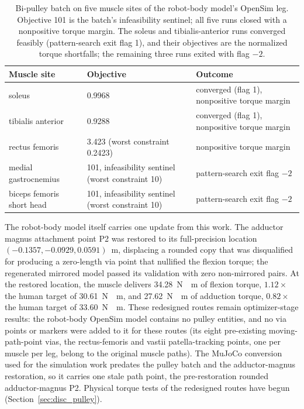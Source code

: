 \begin{table}[htbp]
\caption{Bi-pulley batch on five muscle sites of the robot-body model's OpenSim leg. Objective 101 is the batch's infeasibility sentinel; all five runs closed with a nonpositive torque margin. The soleus and tibialis-anterior runs converged feasibly (pattern-search exit flag 1), and their objectives are the normalized torque shortfalls; the remaining three runs exited with flag $-2$.}
\label{tab:bipulley_batch}
\begin{tabular}{@{}lll@{}}
\toprule
\textbf{Muscle site} & \textbf{Objective} & \textbf{Outcome} \\
\midrule
soleus                    & 0.9968                                       & converged (flag 1), nonpositive torque margin \\
tibialis anterior         & 0.9288                                       & converged (flag 1), nonpositive torque margin \\
rectus femoris            & 3.423 (worst constraint 0.2423)              & nonpositive torque margin \\
medial gastrocnemius      & 101, infeasibility sentinel (worst constraint 10) & pattern-search exit flag $-2$ \\
biceps femoris short head & 101, infeasibility sentinel (worst constraint 10) & pattern-search exit flag $-2$ \\
\bottomrule
\end{tabular}
\end{table}

The robot-body model itself carries one update from this work. The adductor magnus attachment point P2 was restored to its full-precision location $(-0.1357, -0.0929, 0.0591)$~m, displacing a rounded copy that was disqualified for producing a zero-length via point that nullified the flexion torque; the regenerated mirrored model passed its validation with zero non-mirrored pairs. At the restored location, the muscle delivers \qty{34.28}{\newton\cdot\meter} of flexion torque, $1.12\times$ the human target of \qty{30.61}{\newton\cdot\meter}, and \qty{27.62}{\newton\cdot\meter} of adduction torque, $0.82\times$ the human target of \qty{33.60}{\newton\cdot\meter}. These redesigned routes remain optimizer-stage results: the robot-body OpenSim model contains no pulley entities, and no via points or markers were added to it for these routes (its eight pre-existing moving-path-point vias, the rectus-femoris and vastii patella-tracking points, one per muscle per leg, belong to the original muscle paths). The MuJoCo conversion used for the simulation work predates the pulley batch and the adductor-magnus restoration, so it carries one stale path point, the pre-restoration rounded adductor-magnus P2. Physical torque tests of the redesigned routes have begun (Section~\ref{sec:disc_pulley}).

